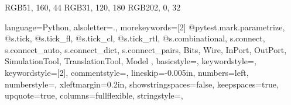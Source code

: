 
\definecolor{dmlgreen}    {RGB}{51,  160,  44}
\definecolor{dmlblue}     {RGB}{31,  120, 180}
\definecolor{dmlred}      {RGB}{202,   0,  32}


\lstset
{%
  language=Python,%
  alsoletter={.},
  morekeywords=[2]{
    @pytest.mark.parametrize,
    @s.tick,
    @s.tick_fl,
    @s.tick_cl,
    @s.tick_rtl,
    @s.combinational,
    s.connect,
    s.connect_auto,
    s.connect_dict,
    s.connect_pairs,
    Bits,
    Wire,
    InPort,
    OutPort,
    SimulationTool,
    TranslationTool,
    Model
  },
  basicstyle={\ttfamily},%
  keywordstyle={\color{cbxgreenC}},%
  keywordstyle={[2]\color{cbxblueC}},%
  commentstyle={\color{cbxredC}},
  lineskip={-0.005in},%
  numbers={left},%
  numberstyle={\tiny},%
  xleftmargin={0.2in},%
  showstringspaces={false},%
  keepspaces={true},%
  upquote={true},%
  columns={fullflexible},%
  stringstyle={\color{brown}},%
}%

